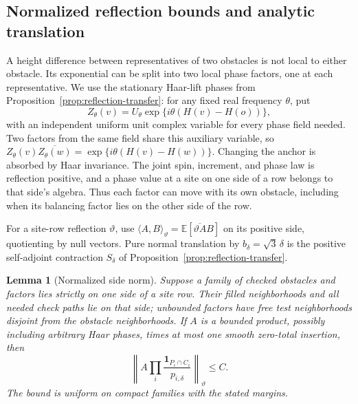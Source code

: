 \documentclass[11pt]{article}
\newtheorem{lemma}[theorem]{Lemma}
\theoremstyle{definition}
\theoremstyle{remark}
\numberwithin{equation}{section}
\begin{document}
\subsection{Normalized reflection bounds and analytic translation}

A height difference between representatives of two obstacles is not
local to either obstacle.  Its exponential can be split into two local
phase factors, one at each representative.  We use the stationary
Haar-lift phases from Proposition~\ref{prop:reflection-transfer}: for any
fixed real frequency $\theta$, put
\begin{equation}\label{pins:haar-phase}
 Z_\theta(v)=U_\theta\exp\{i\theta(H(v)-H(o))\},
\end{equation}
with an independent uniform unit complex variable for every phase field
needed.  Two factors from the same field share this auxiliary variable,
so
$Z_\theta(v)\overline{Z_\theta(w)}
=\exp\{i\theta(H(v)-H(w))\}$.
Changing the anchor is absorbed by Haar invariance.  The joint spin,
increment, and phase law is reflection positive, and a phase value at a
site on one side of a row belongs to that side's algebra.  Thus each
factor can move with its own obstacle, including when its balancing
factor lies on the other side of the row.

For a site-row reflection $\vartheta$, use
$\langle A,B\rangle_\vartheta=\mathbb E[\overline{\vartheta A}B]$ on its
positive side, quotienting by null vectors.  Pure normal translation
by $b_\delta=\sqrt3\,\delta$ is the positive self-adjoint contraction
$S_\delta$ of Proposition~\ref{prop:reflection-transfer}.

\begin{lemma}[Normalized side norm]\label{pins:side-norm}
Suppose a family of checked obstacles and factors lies strictly on one
side of a site row.  Their filled neighborhoods and all needed check
paths lie on that side; unbounded factors have free test neighborhoods
disjoint from the obstacle neighborhoods.  If $A$ is a bounded product,
possibly including arbitrary Haar phases, times at most one smooth
zero-total insertion, then
\begin{equation}\label{pins:normalized-side-bound}
 \left\|A\prod_i\frac{\mathbf 1_{P_i\cap C_i}}{p_{i,\delta}}
       \right\|_\vartheta\le C.
\end{equation}
The bound is uniform on compact families with the stated margins.
\end{lemma}
\end{document}
